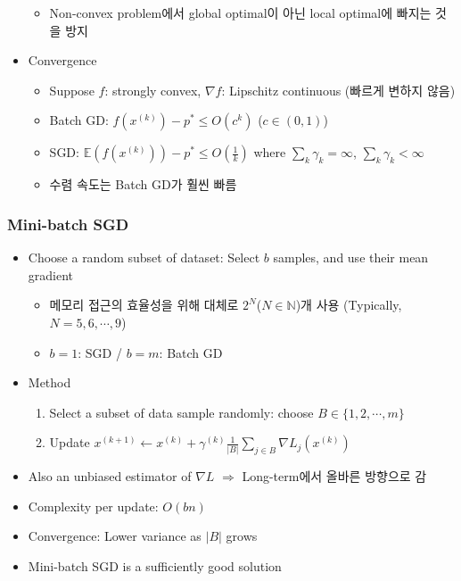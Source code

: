 \begin{itemize}
\begin{itemize}
        \item Non-convex problem에서 global optimal이 아닌 local optimal에 빠지는 것을 방지
    \end{itemize}
    \item Convergence
    \begin{itemize}
        \item Suppose $f$: strongly convex, $\nabla f$: Lipschitz continuous (빠르게 변하지 않음)
        \item Batch GD: $f(x^{(k)})-p^\ast\leq O\left(c^k\right)$ ($c\in(0,1)$)
        \item SGD: $\mathbb{E}(f(x^{(k)}))-p^\ast\leq O\left(\frac{1}{k}\right)$ where $\sum_k\gamma_k=\infty$, $\sum_k\gamma_k<\infty$
        \item 수렴 속도는 Batch GD가 훨씬 빠름
    \end{itemize}
\end{itemize}

\subsubsection*{Mini-batch SGD}
\begin{itemize}
    \item Choose a random subset of dataset: Select $b$ samples, and use their mean gradient
    \begin{itemize}
        \item 메모리 접근의 효율성을 위해 대체로 $2^N$($N\in\mathbb{N}$)개 사용 (Typically, $N=5,6,\cdots,9$)
        \item $b=1$: SGD / $b=m$: Batch GD
    \end{itemize}
    \item Method
    \begin{enumerate}
        \item Select a subset of data sample randomly: choose $B\in\{1,2,\cdots,m\}$
        \item Update $x^{(k+1)}\leftarrow x^{(k)}+\gamma^{(k)}\frac{1}{|B|}\sum_{j\in B}\nabla L_j(x^{(k)})$
    \end{enumerate}
    \item Also an unbiased estimator of $\nabla L$ $\Rightarrow$ Long-term에서 올바른 방향으로 감
    \item Complexity per update: $O(bn)$
    \item Convergence: Lower variance as $|B|$ grows
    \item Mini-batch SGD is a sufficiently good solution
\end{itemize}
\begin{figures}
\end{figures}


